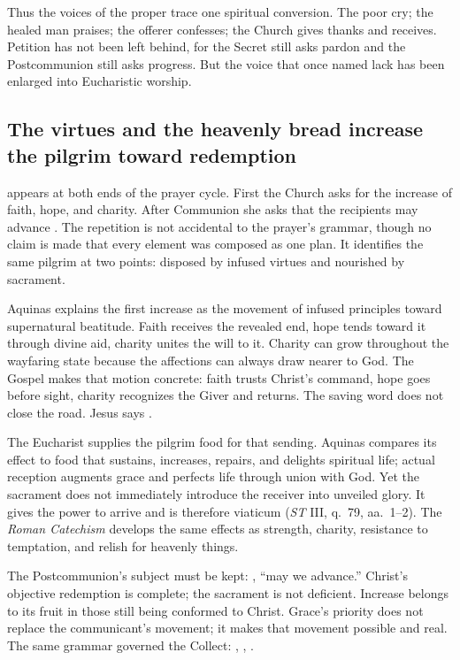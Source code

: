 Thus the voices of the proper trace one spiritual conversion. The poor cry;
the healed man praises; the offerer confesses; the Church gives thanks and
receives. Petition has not been left behind, for the Secret still asks pardon
and the Postcommunion still asks progress. But the voice that once named lack
has been enlarged into Eucharistic worship.

\subsection*{The virtues and the heavenly bread increase the pilgrim toward redemption\enspace
  }

 appears at both ends of the prayer cycle. First the Church
asks for the increase of faith, hope, and charity. After Communion she asks
that the recipients may advance .
The repetition is not accidental to the prayer's grammar, though no claim is
made that every element was composed as one plan. It identifies the same
pilgrim at two points: disposed by infused virtues and nourished by sacrament.

Aquinas explains the first increase as the movement of infused principles
toward supernatural beatitude. Faith receives the revealed end, hope tends
toward it through divine aid, charity unites the will to it. Charity can grow
throughout the wayfaring state because the affections can always draw nearer
to God. The Gospel makes that motion concrete: faith trusts Christ's command,
hope goes before sight, charity recognizes the Giver and returns. The saving
word does not close the road. Jesus says .

The Eucharist supplies the pilgrim food for that sending. Aquinas compares its
effect to food that sustains, increases, repairs, and delights spiritual life;
actual reception augments grace and perfects life through union with God. Yet
the sacrament does not immediately introduce the receiver into unveiled glory.
It gives the power to arrive and is therefore viaticum (\emph{ST} III,
q.~79, aa.~1--2). The \emph{Roman Catechism} develops the same effects as
strength, charity, resistance to temptation, and relish for heavenly things.

The Postcommunion's subject must be kept: , ``may we
advance.'' Christ's objective redemption is complete; the sacrament is not
deficient. Increase belongs to its fruit in those still being conformed to
Christ. Grace's priority does not replace the communicant's movement; it makes
that movement possible and real. The same grammar governed the Collect:
, , .


